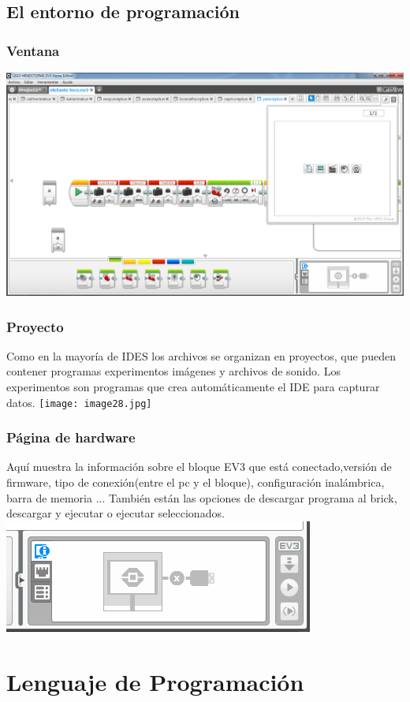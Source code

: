 \documentclass[12pt,a4paper]{article}
\begin{document}
\subsection{El entorno de programación}
\subsubsection{Ventana}
\includegraphics[scale=0.45]{Programa.PNG}
\subsubsection{Proyecto}
Como en la mayoría de IDES los archivos se organizan en proyectos, que pueden contener programas experimentos imágenes y archivos de sonido. Los experimentos son programas que crea automáticamente el IDE  para capturar datos.
\texttt{[image: image28.jpg]}
\subsubsection{Página de hardware}
Aquí muestra la información sobre el bloque EV3 que está conectado,versión de firmware, tipo de conexión(entre el pc y el bloque), configuración inalámbrica, barra de memoria ...
También están las opciones de descargar programa al brick, descargar y ejecutar o ejecutar seleccionados.
\includegraphics[scale=0.5]{controEV3.PNG}
\section{Lenguaje de Programación}
\end{document}
